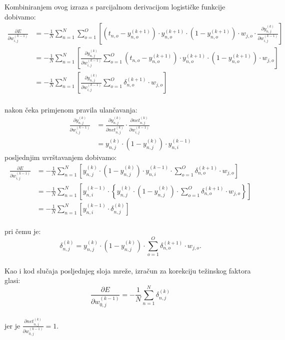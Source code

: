 Kombiniranjem ovog izraza s parcijalnom derivacijom logističke funkcije dobivamo:\\
\begin{align*}
    \frac{\partial E}{\partial w_{i, j}^{(k - 1)}} & = -\frac{1}{N} \sum_{n = 1}^{N} \sum_{o = 1}^{O} \left[
    \left(t_{n, o} - y_{n, o}^{(k + 1)}\right) \cdot y_{n, o}^{(k + 1)} \cdot (1 - y_{n, o}^{(k + 1)}) \cdot w_{j, o}
    \cdot \frac{\partial y_{n, j}^{(k)}}{\partial w_{i, j}^{(k - 1)}}\right]\\
    & = -\frac{1}{N} \sum_{n = 1}^{N} \left[\frac{\partial y_{n, j}^{(k)}}{\partial w_{i, j}^{(k - 1)}}
    \sum_{o = 1}^{O} \left(t_{n, o} - y_{n, o}^{(k + 1)}\right) \cdot y_{n, o}^{(k + 1)} \cdot
    (1 - y_{n, o}^{(k + 1)}) \cdot w_{j, o}\right]\\
    & = -\frac{1}{N} \sum_{n = 1}^{N} \left[\frac{\partial y_{n, j}^{(k)}}{\partial w_{i, j}^{(k - 1)}}
    \sum_{o = 1}^{O} \delta_{n, o}^{(k + 1)} \cdot w_{j, o}\right]
\end{align*}\\
nakon čeka primjenom pravila ulančavanja:\\
\begin{align*}
    \frac{\partial y_{n, j}^{(k)}}{\partial w_{i, j}^{(k - 1)}} & =
    \frac{\partial y_{n, j}^{(k)}}{\partial net_{n, j}^{(k)}} \cdot
    \frac{\partial net_{n, j}^{(k)}}{\partial w_{i, j}^{(k - 1)}}\\
    & = y_{n, j}^{(k)} \cdot (1 - y_{n, j}^{(k)}) \cdot y_{n, i}^{(k - 1)}
\end{align*}
posljednjim uvrštavanjem dobivamo:\\
\begin{align*}
    \frac{\partial E}{\partial w_{i, j}^{(k - 1)}} & = -\frac{1}{N} \sum_{n = 1}^{N} \left[
    y_{n, j}^{(k)} \cdot (1 - y_{n, j}^{(k)}) \cdot y_{n, i}^{(k - 1)} \cdot \sum_{o = 1}^{O} \delta_{n, o}^{(k + 1)}
    \cdot w_{j, o}\right]\\
    & = -\frac{1}{N} \sum_{n = 1}^{N} \left[y_{n, i}^{(k - 1)} \cdot \left\{y_{n, j}^{(k)} \cdot (1 - y_{n, j}^{(k)})
    \cdot \sum_{o = 1}^{O} \delta_{n, o}^{(k + 1)} \cdot w_{j, o}\right\}\right]\\
    & = -\frac{1}{N} \sum_{n = 1}^{N} \left[y_{n, i}^{(k - 1)} \cdot \delta_{n, j}^{(k)}\right]
\end{align*}\\
pri čemu je:\\
\begin{equation*}
    \delta_{n, j}^{(k)} = y_{n, j}^{(k)} \cdot (1 - y_{n, j}^{(k)}) \cdot \sum_{o = 1}^{O} \delta_{n, o}^{(k + 1)} \cdot
    w_{j, o}.
\end{equation*}\\
Kao i kod slučaja posljednjeg sloja mreže, izračun za korekciju težinskog faktora glasi:\\
\begin{equation*}
    \frac{\partial E}{\partial w_{0, j}^{(k - 1)}} = -\frac{1}{N} \sum_{n = 1}^{N} \delta_{n, j}^{(k)}
\end{equation*}\\
jer je $\frac{\partial net_{n, j}^{(k)}}{\partial w_{0, j}^{(k - 1)}} = 1$.

